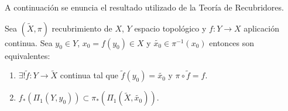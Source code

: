 
A continuación se enuncia el resultado utilizado de la Teoría de Recubridores.

\begin{teorema}
	Sea $(\tilde{X}, \pi)$ recubrimiento de $X$, $Y$ espacio topológico y $f:Y \rightarrow X$ aplicación continua. Sea $y_0 \in Y$, $x_0=f(y_0) \in X$ y $\tilde{x_0} \in \pi^{-1}(x_0)$ entonces son equivalentes:
	\begin{enumerate}
		\item $\exists ! \tilde{f}:Y \rightarrow \tilde{X}$ continua tal que $\tilde{f}(y_0) = \tilde{x_0}$ y $\pi \circ \tilde{f} = f$.
		\item $f_*(\Pi_1(Y, y_0)) \subset \pi_*(\Pi_1(\tilde{X}, \tilde{x_0}))$.
	\end{enumerate}
\end{teorema}

\endinput
